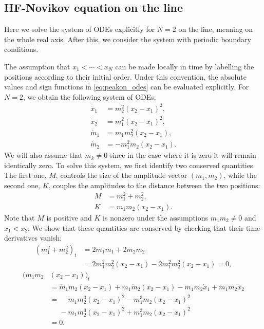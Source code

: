 \documentclass[english,master]{liumaiex}
\theoremstyle{thesisplain}
\theoremstyle{thesisdefinition}
\numberwithin{equation}{section}
\begin{document}
\subsection{HF-Novikov equation on the line} \label{sec:N2SolLine}
Here we solve the system of ODEs explicitly for $N=2$ on the line, meaning on the whole real axis. After this, we consider the system with periodic boundary conditions.

The assumption that $x_1 < \cdots < x_N$ can be made locally in time by labelling the positions according to their initial order. Under this convention, the absolute values and sign functions in \eqref{eq:peakon_odes} can be evaluated explicitly. For $N=2$, we obtain the following system of ODEs:
%
\begin{align}
	\dot{x}_1 & = m_2^2 (x_2 - x_1)^2, \\
	\dot{x}_2 & = m_1^2 (x_2 - x_1)^2, \\
	\dot{m}_1 & = m_1 m_2^2(x_2 - x_1),  \\
	\dot{m}_2 & = -m_1^2 m_2(x_2 - x_1).
\end{align}
%
We will also assume that $m_k \neq 0$ since in the case where it is zero it will remain identically zero.
%
To solve this system, we first identify two conserved quantities. The first one, $M$, controls the size of the amplitude vector $(m_1,m_2)$, while the second one, $K$, couples the amplitudes to the distance between the two positions:
\begin{align}
	\label{eq:solution_2N_M}
	M &= m_1^2 + m_2^2, \\
	\label{eq:solution_2N_K}
	K &= m_1m_2(x_2 - x_1).
\end{align}
%
Note that $M$ is positive and $K$ is nonzero under the assumptions $m_1m_2\neq 0$ and $x_1 < x_2$. We show that these quantities are conserved by checking that their time derivatives vanish:
\begin{equation}
\begin{aligned}
	(m_1^2 + m_2^2)_t 
	&= 2m_1\dot{m}_1 + 2m_2\dot{m}_2 \\
	&= 2m_1^2m_2^2(x_2 - x_1) - 2m_1^2m_2^2(x_2 - x_1) = 0,
\end{aligned}
\end{equation}
\begin{equation}
\begin{aligned}
	(m_1m_2&(x_2 - x_1))_t \\
	&= \dot{m}_1m_2(x_2 - x_1) + m_1\dot{m}_2(x_2 - x_1)
	- m_1m_2\dot{x}_1 + m_1m_2\dot{x}_2 \\
	&=\phantom{-} m_1m_2^3(x_2 - x_1)^2 - m_1^3m_2(x_2 - x_1)^2 \\
	&\phantom{=}- m_1m_2^3(x_2 - x_1)^2 + m_1^3m_2(x_2 - x_1)^2 \\
	&=0. \\
\end{aligned}
\end{equation}
\end{document}
